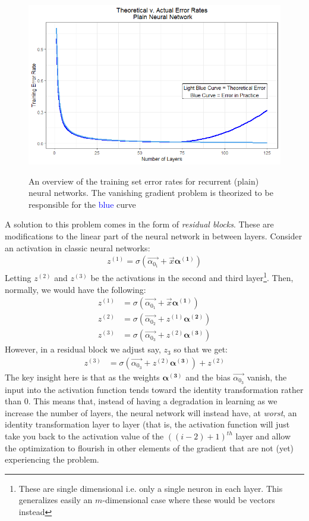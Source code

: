 \documentclass{article}
\begin{document}
\begin{figure}[h!]
  \centering
  \includegraphics[scale = 0.5]{error_plot2.png}
  \label{fig:error_theory}
  \caption{An overview of the training set error rates for recurrent (plain) neural networks. The vanishing gradient problem is theorized to be responsible for the \textcolor{blue}{blue} curve}
\end{figure}

\noindent A solution to this problem comes in the form of \textit{residual blocks}. These are modifications to the linear part of the neural network in between layers. Consider an activation in classic neural networks:
\begin{align}
    z^{(1)} = \sigma(\vec{\alpha_{0_{1}}} + \vec{x}\boldsymbol{\alpha^{(1)}})
\end{align}
\noindent Letting $z^{(2)}$ and $z^{(3)}$ be the activations in the second and third layer\footnote{These are single dimensional i.e. only a single neuron in each layer. This generalizes easily an $m$-dimensional case where these would be vectors instead}. Then, normally, we would have the following:
\begin{align}
    z^{(1)} &= \sigma(\vec{\alpha_{0_{1}}} + \vec{x}\boldsymbol{\alpha^{(1)}})\\
    z^{(2)} &= \sigma(\vec{\alpha_{0_{2}}} + z^{(1)}\boldsymbol{\alpha^{(2)}})\\
    z^{(3)} &= \sigma(\vec{\alpha_{0_{3}}} + z^{(2)}\boldsymbol{\alpha^{(3)}})
\end{align}
\noindent However, in a residual block we adjust say, $z_3$ so that we get:
\begin{align}
    z^{(3)} &= \sigma(\vec{\alpha_{0_{3}}} + z^{(2)}\boldsymbol{\alpha^{(3)}}) + z^{(2)}
\end{align}
\noindent The key insight here is that as the weights $\boldsymbol{\alpha^{(3)}}$ and the bias $\vec{\alpha_{0_{3}}}$ vanish, the input into the activation function tends toward the identity transformation rather than 0. This means that, instead of having a degradation in learning as we increase the number of layers, the neural network will instead have, at \textit{worst}, an identity transformation layer to layer (that is, the activation function will just take you back to the activation value of the $((i - 2) + 1)^{th}$ layer and allow the optimization to flourish in other elements of the gradient that are not (yet) experiencing the problem.
\end{document}
